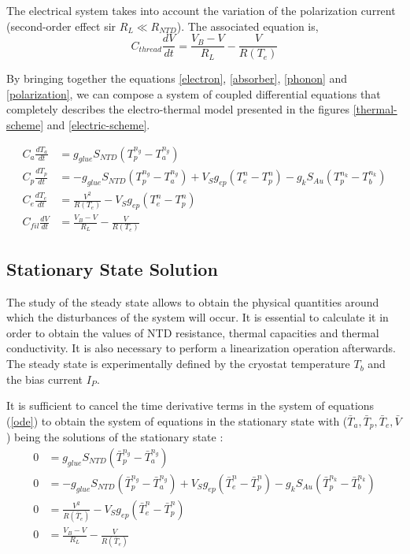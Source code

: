 The electrical system takes into account the variation of the polarization current (second-order effect sir $R_L\ll R_{NTD}$). The associated equation is,
\begin{equation}
\label{polarization}
C_{thread} \frac{d V}{d t} = \frac{V_B - V}{R_L} - \frac{V}{R(T_e)}
\end{equation}

By bringing together the equations \ref{electron}, \ref{absorber}, \ref{phonon} and \ref{polarization}, we can compose a system of coupled differential equations that completely describes the electro-thermal model presented in the figures \ref{thermal-scheme} and \ref{electric-scheme}.

\begin{align}
\label{ode}
 C_a \frac{d T_a}{d t} &= g_{glue} S_{NTD} \left( T_p^{n_g} - T_a^{n_g} \right) \nonumber \\ 
 C_p \frac{d T_p}{d t} &= -g_{glue} S_{NTD} \left( T_p^{n_g} - T_a^{n_g} \right)  + V_S g_{ep} \left( T_e^{n} - T_p^{n} \right) - g_k S_{Au} \left( T_p^{n_k} - T_b^{n_k} \right) \nonumber \\ 
 C_e \frac{d T_e}{d t} &= \frac{V^2}{R(T_e)} - V_S g_{ep} \left( T_e^{n} - T_p^{n} \right) \nonumber \\ 
 C_{fil} \frac{d V}{d t} &= \frac{V_B - V}{R_L} - \frac{V}{R(T_e)}
\end{align}

\subsection{Stationary State Solution}
\label{steady-section}

The study of the steady state allows to obtain the physical quantities around which the disturbances of the system will occur. It is essential to calculate it in order to obtain the values of NTD resistance, thermal capacities and thermal conductivity. It is also necessary to perform a linearization operation afterwards. The steady state is experimentally defined by the cryostat temperature $T_b$ and the bias current $I_P$. 

It is sufficient to cancel the time derivative terms in the system of equations (\ref{ode}) to obtain the system of equations in the stationary state with ($\bar{T}_a, \bar{T}_p, \bar{T}_e, \bar{V}$) being the solutions of the stationary state :
\begin{align}
\label{steady}
0 &= g_{glue} S_{NTD} \left( \bar{T}_p^{n_g} - \bar{T}_a^{n_g} \right) \nonumber \\
0 &= -g_{glue} S_{NTD} \left( \bar{T}_p^{n_g} - \bar{T}_a^{n_g} \right) + V_S  g_{ep} \left( \bar{T}_e^{n} - \bar{T}_p^{n} \right) - g_k S_{Au} \left( \bar{T}_p^{n_k} - \bar{T}_b^{n_k} \right) \nonumber \\
0 &= \frac{V^2}{R(\bar{T}_e)} - V_S g_{ep} \left( \bar{T}_e^{n} - \bar{T}_p^{n} \right) \nonumber \\
0 &= \frac{V_B - V}{R_L} - \frac{V}{R(\bar{T}_e)}
\end{align}

